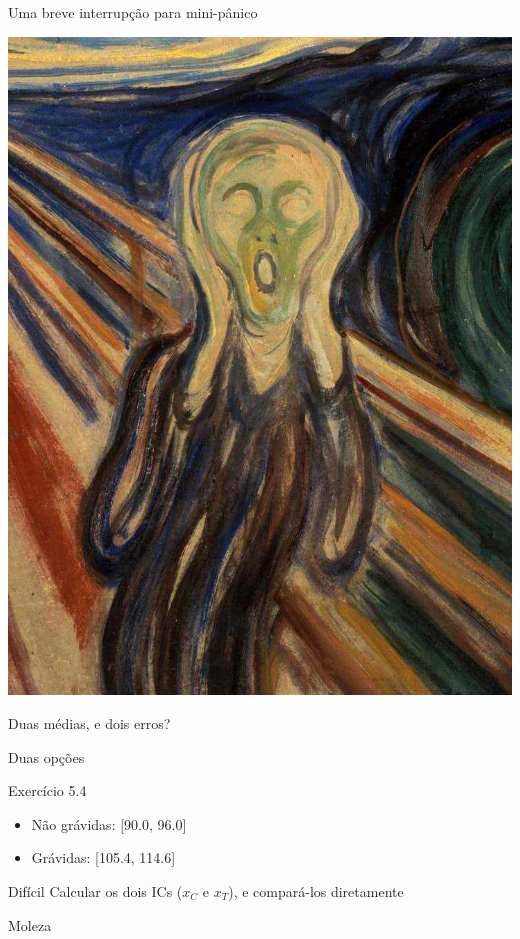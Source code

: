 \documentclass{beamer}
\begin{document}
\begin{frame}{\scriptsize Uma breve interrupção para mini-pânico}
  \begin{center}
    \includegraphics[height=.7\textheight]{Cap7/ogrito}
  \end{center}
  \begin{block}{}
    \begin{center}
      Duas médias, e dois erros?
    \end{center}
  \end{block}
\end{frame}

\begin{frame}{\scriptsize Duas opções}
  \begin{exampleblock}{Exercício 5.4}
    \footnotesize
    \begin{itemize}
      \footnotesize
    \item Não grávidas: [90.0, 96.0]
    \item Grávidas: [105.4, 114.6]
    \end{itemize}
  \end{exampleblock}
  \begin{block}{Difícil}
    Calcular os dois ICs ($x_C$ e $x_T$), e compará-los diretamente
  \end{block}
  \begin{block}{Moleza}
  \end{block}
\end{frame}
\end{document}
